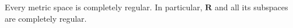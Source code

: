 Every metric space is completely regular. In particular, $\mathbf{R}$ and all its subspaces are completely regular.
